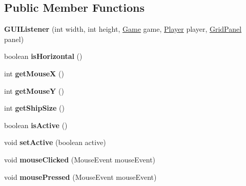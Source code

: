 \subsection*{Public Member Functions}
\begin{DoxyCompactItemize}
\item 
{\bfseries G\+U\+I\+Listener} (int width, int height, \hyperlink{classGame}{Game} game, \hyperlink{classPlayer}{Player} player, \hyperlink{classGridPanel}{Grid\+Panel} panel)\hypertarget{classGUIListener_af4885004ac07dbdcc72cde2b7c0cde14}{}\label{classGUIListener_af4885004ac07dbdcc72cde2b7c0cde14}

\item 
boolean {\bfseries is\+Horizontal} ()\hypertarget{classGUIListener_af6a1761ae16169e68eadc58cf7051bea}{}\label{classGUIListener_af6a1761ae16169e68eadc58cf7051bea}

\item 
int {\bfseries get\+MouseX} ()\hypertarget{classGUIListener_a11a624deb04ae126517f37e6b1883aad}{}\label{classGUIListener_a11a624deb04ae126517f37e6b1883aad}

\item 
int {\bfseries get\+MouseY} ()\hypertarget{classGUIListener_ad8f1ceb49938fc6c5869202ac1383b74}{}\label{classGUIListener_ad8f1ceb49938fc6c5869202ac1383b74}

\item 
int {\bfseries get\+Ship\+Size} ()\hypertarget{classGUIListener_a4c107528ebd4f160674ecbaf9b125bf9}{}\label{classGUIListener_a4c107528ebd4f160674ecbaf9b125bf9}

\item 
boolean {\bfseries is\+Active} ()\hypertarget{classGUIListener_a0559c02a1f4b20ba00b3195d76de05d4}{}\label{classGUIListener_a0559c02a1f4b20ba00b3195d76de05d4}

\item 
void {\bfseries set\+Active} (boolean active)\hypertarget{classGUIListener_a2834f4c5089485e247184aba22ffa36e}{}\label{classGUIListener_a2834f4c5089485e247184aba22ffa36e}

\item 
void {\bfseries mouse\+Clicked} (Mouse\+Event mouse\+Event)\hypertarget{classGUIListener_ab0cfe7af17bab2decc326dc1a0b0373b}{}\label{classGUIListener_ab0cfe7af17bab2decc326dc1a0b0373b}

\item 
void {\bfseries mouse\+Pressed} (Mouse\+Event mouse\+Event)\hypertarget{classGUIListener_a924b03b8a466f02543597017825c92a0}{}\label{classGUIListener_a924b03b8a466f02543597017825c92a0}


\end{DoxyCompactItemize}
